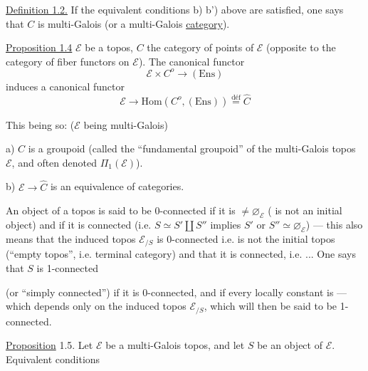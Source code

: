 \uline{Definition 1.2.} If the equivalent conditions b) b') above
are satisfied, one says that \(C\)
is  multi-Galois  
(or a multi-Galois \uline{category}).


\uline{Proposition 1.4}  \(\mathcal E\) be a topos,
\(C\) the category of points of \(\mathcal E\) (opposite to the
category of fiber functors on \(\mathcal E\)). The canonical
functor
\[
\mathcal E\times C^o\longrightarrow(\mathrm{Ens})
\]
induces a canonical functor
\[
\mathcal E\longrightarrow\mathrm{Hom}(C^o,(\mathrm{Ens}))
\overset{\mathrm{déf}}{=}\widehat C
\]

This being so: (\(\mathcal E\) being multi-Galois)

a) \(C\) is a groupoid (called the ``fundamental groupoid'' of the
multi-Galois topos \(\mathcal E\), and often denoted
\(\Pi_1(\mathcal E)\)).

b) \(\mathcal E\longrightarrow\widehat C\) is an equivalence
of categories.

An object  of a topos 
is said to be 0-connected if it is \(\ne\varnothing_{\mathcal E}\)
( is not an initial object) and if it is connected
(i.e. \(S\simeq S'\amalg S''\) implies
\(S'\) or \(S''\simeq\varnothing_{\mathcal E}\)) --- this also means
that the induced topos \(\mathcal E_{/S}\) is 0-connected
i.e. is not the initial topos (``empty topos'', i.e.
 terminal category) and that it is connected,
i.e. ... One says that \(S\) is 1-connected


(or ``simply connected'') if it is 0-connected, and if every
locally constant  is 
--- which depends  only on the induced topos
\(\mathcal E_{/S}\), which will then be said to be 1-connected.

\uline{Proposition} 1.5. Let \(\mathcal E\) be a multi-Galois topos,
and let \(S\) be an object of \(\mathcal E\). Equivalent conditions

